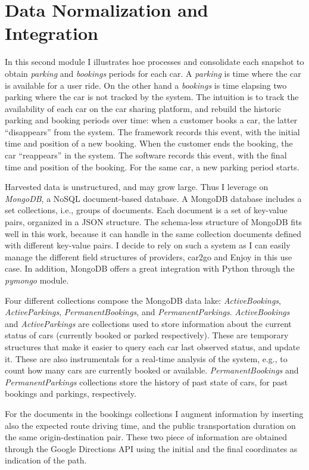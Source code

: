 \section{Data Normalization and Integration}
\label{sec:2_4_data_normalization}
In this second module I illustrates hoe \tool processes and consolidate each snapshot to obtain \emph{parking} and \emph{bookings} periods for each car. A \emph{parking} is time where the car is available for a user ride. On the other hand a \emph{bookings} is time elapsing two parking where the car is not tracked by the system. The intuition is to track the availability of each car on the car sharing platform, and rebuild the historic parking and booking periods over time: when a customer books a car, the latter ``disappears'' from the system. The framework records this event, with the initial time and position of a new booking. When the customer ends the booking, the car ``reappears'' in the system. The software records this event, with the final time and position of the booking. For the same car, a new parking period starts.

Harvested data is unstructured, and may grow large. Thus I leverage on \textit{MongoDB}, a NoSQL document-based database. A MongoDB database includes a set collections, i.e., groups of documents. Each document is a set of key-value pairs, organized in a JSON structure. The schema-less structure of MongoDB fits well in this work, because it can handle in the same collection documents defined with different key-value pairs. I decide to rely on such a system as I can easily manage the different field structures of providers, car2go and Enjoy in this use case. In addition, MongoDB offers a great integration with Python through the \textit{pymongo} module.

Four different collections compose the MongoDB data lake:  \textit{ActiveBookings}, \textit{ActiveParkings}, \textit{PermanentBookings}, and \textit{PermanentParkings}. 
\textit{ActiveBookings} and \textit{ActiveParkings} are collections used to store information about the current status of cars (currently booked or parked respectively). These are temporary structures that make it easier to query each car last observed status, and update it. These are also instrumentals for a real-time analysis of the system, e.g., to count how many cars are currently booked or available.
\textit{PermanentBookings} and \textit{PermanentParkings} collections store the history of past state of cars, for past bookings and parkings, respectively.

For the documents in the bookings collections I augment information by inserting also the expected route driving time, and the public transportation duration on the same origin-destination pair. These two piece of information are obtained through the Google Directions API using the initial and the final coordinates as indication of the path.

